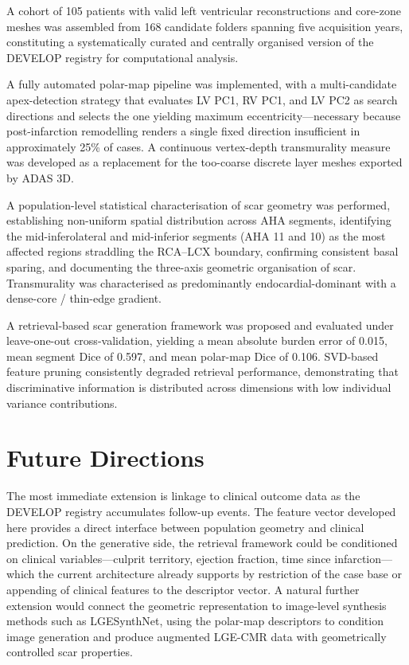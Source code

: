 A cohort of 105 patients with valid left ventricular reconstructions and core-zone meshes was
assembled from 168 candidate folders spanning five acquisition years, constituting a
systematically curated and centrally organised version of the DEVELOP registry for
computational analysis.

A fully automated polar-map pipeline was implemented, with a multi-candidate
apex-detection strategy that evaluates LV PC1, RV PC1, and LV PC2 as search directions
and selects the one yielding maximum eccentricity---necessary because post-infarction
remodelling renders a single fixed direction insufficient in approximately 25\% of cases. A
continuous vertex-depth transmurality measure was developed as a replacement for the
too-coarse discrete layer meshes exported by ADAS 3D.

A population-level statistical characterisation of scar geometry was performed, establishing
non-uniform spatial distribution across AHA segments, identifying the mid-inferolateral and
mid-inferior segments (AHA 11 and 10) as the most affected regions straddling the
RCA--LCX boundary, confirming consistent basal sparing, and documenting the three-axis
geometric organisation of scar. Transmurality was characterised as predominantly
endocardial-dominant with a dense-core / thin-edge gradient.

A retrieval-based scar generation framework was proposed and evaluated under
leave-one-out cross-validation, yielding a mean absolute burden error of 0.015, mean
segment Dice of 0.597, and mean polar-map Dice of 0.106. SVD-based feature pruning
consistently degraded retrieval performance, demonstrating that discriminative information is
distributed across dimensions with low individual variance contributions.

\section*{Future Directions}

The most immediate extension is linkage to clinical outcome data as the DEVELOP registry
accumulates follow-up events. The feature vector developed here provides a direct interface
between population geometry and clinical prediction. On the generative side, the retrieval
framework could be conditioned on clinical variables---culprit territory, ejection fraction, time
since infarction---which the current architecture already supports by restriction of the case
base or appending of clinical features to the descriptor vector. A natural further extension
would connect the geometric representation to image-level synthesis methods such as
LGESynthNet, using the polar-map descriptors to condition image generation and produce
augmented LGE-CMR data with geometrically controlled scar properties.

